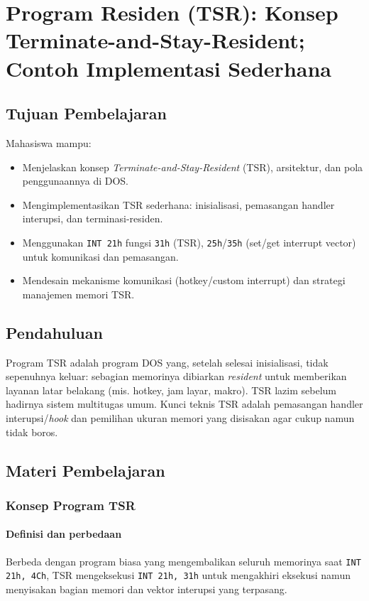 \chapter{Program Residen (TSR): Konsep Terminate-and-Stay-Resident; Contoh Implementasi Sederhana}

\section{Tujuan Pembelajaran}
Mahasiswa mampu:
\begin{itemize}
  \item Menjelaskan konsep \textit{Terminate-and-Stay-Resident} (TSR), arsitektur, dan pola penggunaannya di DOS.
  \item Mengimplementasikan TSR sederhana: inisialisasi, pemasangan handler interupsi, dan terminasi-residen.
  \item Menggunakan \texttt{INT 21h} fungsi \texttt{31h} (TSR), \texttt{25h}/\texttt{35h} (set/get interrupt vector) untuk komunikasi dan pemasangan.
  \item Mendesain mekanisme komunikasi (hotkey/custom interrupt) dan strategi manajemen memori TSR.
\end{itemize}

\section{Pendahuluan}
Program TSR adalah program DOS yang, setelah selesai inisialisasi, tidak sepenuhnya keluar: sebagian memorinya dibiarkan \textit{resident} untuk memberikan layanan latar belakang (mis. hotkey, jam layar, makro). TSR lazim sebelum hadirnya sistem multitugas umum. Kunci teknis TSR adalah pemasangan handler interupsi/\textit{hook} dan pemilihan ukuran memori yang disisakan agar cukup namun tidak boros.

\section{Materi Pembelajaran}
\subsection{Konsep Program TSR}
\subsubsection{Definisi dan perbedaan}
Berbeda dengan program biasa yang mengembalikan seluruh memorinya saat \texttt{INT 21h, 4Ch}, TSR mengeksekusi \texttt{INT 21h, 31h} untuk mengakhiri eksekusi namun menyisakan bagian memori dan vektor interupsi yang terpasang.


